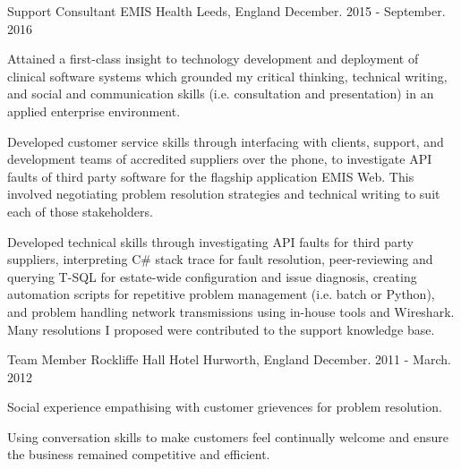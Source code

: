 \begin{cventries}
  \cventry
    {Support Consultant} %
    {EMIS Health} %
    {Leeds, England} %
    {December. 2015 - September. 2016} %
    {
      \begin{cvitems} %
	\item {Attained a first-class insight to technology development and deployment of clinical software systems which grounded my critical thinking, technical writing, and social and communication skills  (i.e. consultation and presentation) in an applied enterprise environment.}
	\item {Developed customer service skills through interfacing with clients, support, and development teams of accredited suppliers over the phone, to investigate API faults of third party software for the flagship application EMIS Web. This involved negotiating problem resolution strategies and technical writing to suit each of those stakeholders.}
	\item{Developed technical skills through investigating API faults for third party suppliers, interpreting C\# stack trace for fault resolution, peer-reviewing and querying T-SQL for estate-wide configuration and issue diagnosis, creating automation scripts for repetitive problem management (i.e. batch or Python), and problem handling network transmissions using in-house tools and Wireshark. Many resolutions I proposed were contributed to the support knowledge base.}
      \end{cvitems}
    }

  \cventry
    {Team Member} %
    {Rockliffe Hall Hotel} %
    {Hurworth, England} %
    {December. 2011 - March. 2012} %
    {
      \begin{cvitems} %
        \item{Social experience empathising with customer grievences for problem resolution.}
        \item{Using conversation skills to make customers feel continually welcome and ensure the business remained competitive and efficient.} 
      \end{cvitems}
    }

\end{cventries}
